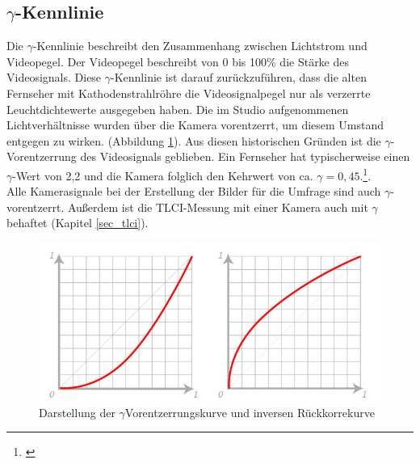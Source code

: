 \subsection{$\gamma$-Kennlinie}
\label{sec_gamma}
Die $\gamma$-Kennlinie beschreibt den Zusammenhang zwischen Lichtstrom und Videopegel. Der Videopegel beschreibt von 0 bis 100\% die Stärke des Videosignals. Diese $\gamma$-Kennlinie ist darauf zurückzuführen, dass die alten Fernseher mit Kathodenstrahlröhre die Videosignalpegel nur als verzerrte Leuchtdichtewerte ausgegeben haben. Die im Studio aufgenommenen Lichtverhältnisse wurden über die Kamera vorentzerrt, um diesem Umstand entgegen zu wirken. (Abbildung \ref{b_gamma}). Aus diesen historischen Gründen ist die $\gamma$-Vorentzerrung des Videosignals geblieben. Ein Fernseher hat typischerweise einen $\gamma$-Wert von 2,2 und die Kamera folglich den Kehrwert von ca. $\gamma=0,45$.\footnote{\cite[408-409]{schmidt}}.\\
Alle Kamerasignale bei der Erstellung der Bilder für die Umfrage sind auch $\gamma$-vorentzerrt. Außerdem ist die TLCI-Messung mit einer Kamera auch mit $\gamma$ behaftet (Kapitel \ref{sec_tlci}).

\begin{figure}[H]     %
\centering
\includegraphics[width=1.0\textwidth]{bilder/gamma} 
\caption {Darstellung der $\gamma$Vorentzerrungskurve und inversen Rückkorrekurve\protect\footnotemark}\label{b_gamma}
\end{figure}

